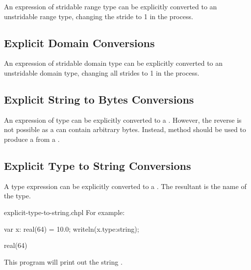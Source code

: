 An expression of stridable range type can be explicitly converted
to an unstridable range type, changing the stride to 1 in the process.

\subsection{Explicit Domain Conversions}
\label{Explicit_Domain_Conversions}

An expression of stridable domain type can be explicitly converted
to an unstridable domain type, changing all strides to 1 in the process.

\subsection{Explicit String to Bytes Conversions}
\label{Explicit_String_to_Bytes_Conversions}

An expression of  type can be explicitly converted to a
. However, the reverse is not possible as a  can contain
arbitrary bytes. Instead,  method should be used to produce
a  from a .

\subsection{Explicit Type to String Conversions}
\label{Explicit_Type_to_String_Conversions}

A type expression can be explicitly converted to a . The resultant
 is the name of the type.

\begin{chapelexample}{explicit-type-to-string.chpl}
For example:
\begin{chapel}
var x: real(64) = 10.0;
writeln(x.type:string);
\end{chapel}
\begin{chapeloutput}
real(64)
\end{chapeloutput}
This program will print out the string .
\end{chapelexample}
